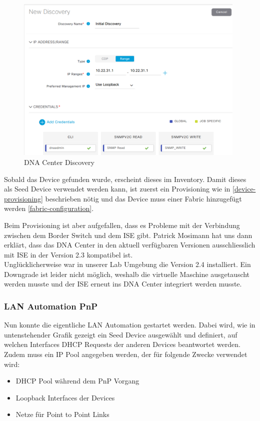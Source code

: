 \begin{figure}[H]
	\centering
	\includegraphics[height=8cm]{img/secondtry/dna-discovery.png}
	\caption{DNA Center Discovery}
	\label{fig:dna-discovery}
\end{figure}

Sobald das Device gefunden wurde, erscheint dieses im Inventory. Damit dieses als Seed Device verwendet werden kann, ist zuerst ein Provisioning wie in \ref{device-provisioning} beschrieben nötig und das Device muss einer Fabric hinzugefügt werden \ref{fabric-configuration}. 

Beim Provisioning ist aber aufgefallen, dass es Probleme mit der Verbindung zwischen dem Border Switch und dem ISE gibt. Patrick Mosimann hat uns dann erklärt, dass das DNA Center in den aktuell verfügbaren Versionen ausschliesslich mit ISE in der Version 2.3 kompatibel ist.\\
Unglücklicherweise war in unserer Lab Umgebung die Version 2.4 installiert. Ein Downgrade ist leider nicht möglich, weshalb die virtuelle Maschine ausgetauscht werden musste und der ISE erneut ins DNA Center integriert werden musste. 

\subsubsection{LAN Automation PnP}

Nun konnte die eigentliche LAN Automation gestartet werden. Dabei wird, wie in untenstehender Grafik gezeigt ein Seed Device ausgewählt und definiert, auf welchen Interfaces DHCP Requests der anderen Devices beantwortet werden. Zudem muss ein IP Pool angegeben werden, der für folgende Zwecke verwendet wird:
\begin{itemize}
	\item DHCP Pool während dem PnP Vorgang
	\item Loopback Interfaces der Devices
	\item Netze für Point to Point Links
\end{itemize}

